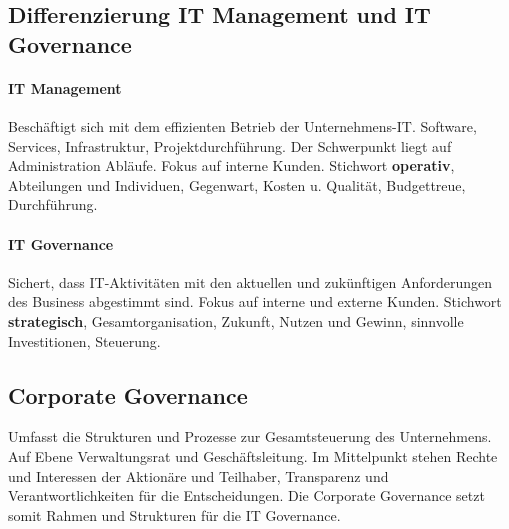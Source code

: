 \subsection{Differenzierung IT Management und IT Governance}
\paragraph{IT Management} Beschäftigt sich mit dem effizienten Betrieb der Unternehmens-IT. Software, Services, Infrastruktur, Projektdurchführung. Der Schwerpunkt liegt auf Administration Abläufe. Fokus auf interne Kunden. Stichwort \textbf{operativ}, Abteilungen und Individuen, Gegenwart, Kosten u. Qualität, Budgettreue, Durchführung.
\paragraph{IT Governance} Sichert, dass IT-Aktivitäten mit den aktuellen und zukünftigen Anforderungen des Business abgestimmt sind. Fokus auf interne und externe Kunden. Stichwort \textbf{strategisch}, Gesamtorganisation, Zukunft, Nutzen und Gewinn, sinnvolle Investitionen, Steuerung.

\subsection{Corporate Governance}
Umfasst die Strukturen und Prozesse zur Gesamtsteuerung des Unternehmens. Auf Ebene Verwaltungsrat und Geschäftsleitung. Im Mittelpunkt stehen Rechte und Interessen der Aktionäre und Teilhaber, Transparenz und Verantwortlichkeiten für die Entscheidungen.
Die Corporate Governance setzt somit Rahmen und Strukturen für die IT Governance.

